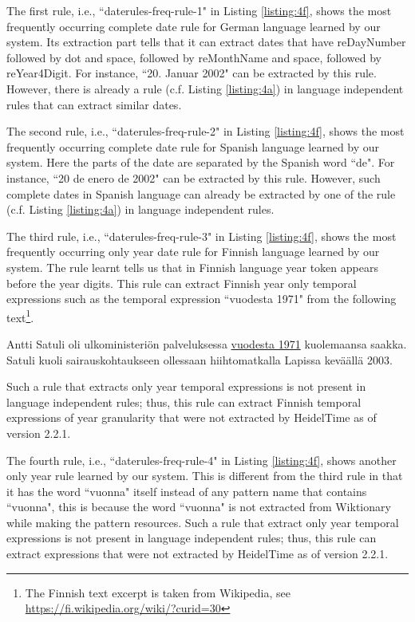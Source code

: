 The first rule, i.e., ``daterules-freq-rule-1" in Listing \ref{listing:4f}, shows the most frequently occurring complete date rule for German language learned by our system. Its extraction part tells that it can extract dates that have reDayNumber followed by dot and space, followed by reMonthName and space, followed by reYear4Digit. For instance, ``20. Januar 2002" can be extracted by this rule. However, there is already a rule (c.f. Listing \ref{listing:4a}) in language independent rules that can extract similar dates.

The second rule, i.e., ``daterules-freq-rule-2" in Listing \ref{listing:4f}, shows the most frequently occurring complete date rule for Spanish language learned by our system. Here the parts of the date are separated by the Spanish word ``de". For instance, ``20 de enero de 2002" can be extracted by this rule. However, such complete dates in Spanish language can already be extracted by one of the rule (c.f. Listing \ref{listing:4a}) in language independent rules. 

The third rule, i.e., ``daterules-freq-rule-3" in Listing \ref{listing:4f}, shows the most frequently occurring only year date rule for Finnish language learned by our system. The rule learnt tells us that in Finnish language year token appears before the year digits. This rule can extract Finnish year only temporal expressions such as the temporal expression ``vuodesta 1971" from the following text\footnote{The Finnish text excerpt is taken from Wikipedia, see \url{https://fi.wikipedia.org/wiki/?curid=30}}.  

\begin{mdframed}[style=MyFrame]
	\raggedright{
		Antti Satuli oli ulkoministeriön palveluksessa \ul{vuodesta 1971} kuolemaansa saakka. Satuli kuoli sairauskohtaukseen ollessaan hiihtomatkalla Lapissa keväällä 2003.
	}
\end{mdframed}

Such a rule that extracts only year temporal expressions is not present in language independent rules; thus, this rule can extract Finnish temporal expressions of year granularity that were not extracted by HeidelTime as of version 2.2.1.

The fourth rule, i.e., ``daterules-freq-rule-4" in Listing \ref{listing:4f}, shows another only year rule learned by our system. This is different from the third rule in that it has the word ``vuonna" itself instead of any pattern name that contains ``vuonna", this is because the word ``vuonna" is not extracted from Wiktionary while making the pattern resources. Such a rule that extract only year temporal expressions is not present in language independent rules; thus, this rule can extract expressions that were not extracted by HeidelTime as of version 2.2.1.


